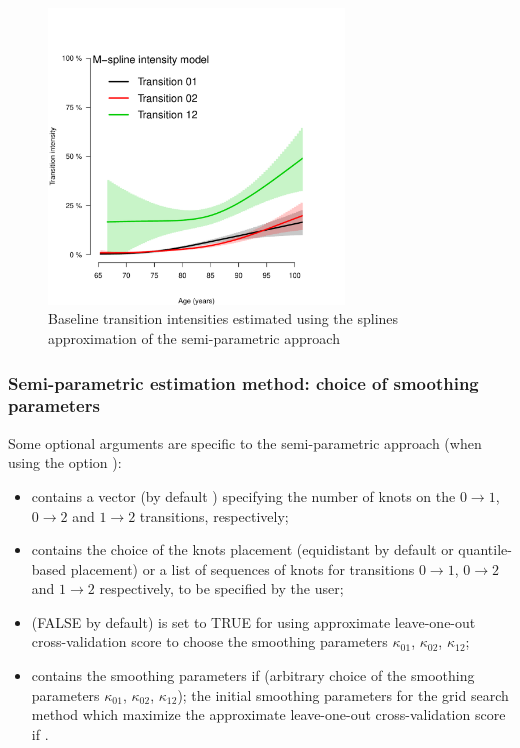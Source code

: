 \documentclass[article]{jss}
\begin{document}
\begin{figure}[htb]
\centering
\includegraphics[width=0.7\textwidth]{transition-intensities-paq-splines.pdf}
\caption{\label{fig:alpha_splines}Baseline transition intensities estimated using the splines approximation of the semi-parametric approach}
\end{figure}


\subsubsection{Semi-parametric estimation method: choice of smoothing parameters}
\label{sec-5-3-1}

Some optional arguments are specific to the semi-parametric approach
(when using the option ):

\begin{itemize}
\item {} contains a vector (by default )
specifying the number of knots on the \(0 \rightarrow 1\), \(0
  \rightarrow 2\) and \(1 \rightarrow 2\) transitions, respectively;
\item {} contains the choice of the knots placement (equidistant
by default or quantile-based placement) or a list of sequences of
knots for transitions \(0 \rightarrow 1\), \(0 \rightarrow 2\) and \(1
  \rightarrow 2\) respectively, to be specified by the user;
\item {} (FALSE by default) is set to TRUE for using approximate
leave-one-out cross-validation score to choose the smoothing
parameters \(\kappa_{01}\), \(\kappa_{02}\), \(\kappa_{12}\);
\item {} contains the smoothing parameters if 
(arbitrary choice of the smoothing parameters \(\kappa_{01}\),
\(\kappa_{02}\), \(\kappa_{12}\)); the initial smoothing parameters for
the grid search method which maximize the approximate leave-one-out
cross-validation score if .
\end{itemize}
\end{document}
